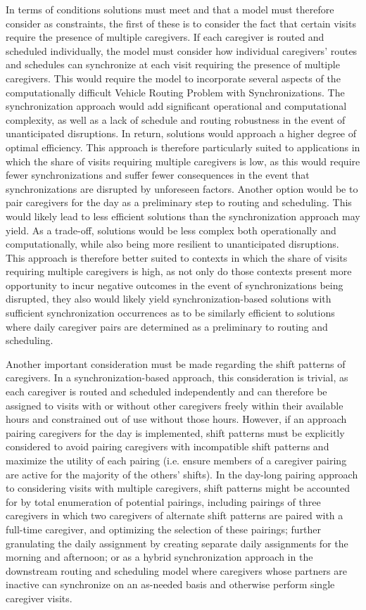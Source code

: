 \documentclass[11pt,twoside]{article}
\numberwithin{Theorem}{section}
\numberwithin{Definition}{section}
\numberwithin{Lemma}{section}
\numberwithin{Algorithm}{section}
\numberwithin{equation}{section}
\begin{document}
In terms of conditions solutions must meet and that a model must therefore consider as constraints, the first of these is to consider the fact that certain visits require the presence of multiple caregivers. If each caregiver is routed and scheduled individually, the model must consider how individual caregivers' routes and schedules can synchronize at each visit requiring the presence of multiple caregivers. This would require the model to incorporate several aspects of the computationally difficult Vehicle Routing Problem with Synchronizations. The synchronization approach would add significant operational and computational complexity, as well as a lack of schedule and routing robustness in the event of unanticipated disruptions. In return, solutions would approach a higher degree of optimal efficiency. This approach is therefore particularly suited to applications in which the share of visits requiring multiple caregivers is low, as this would require fewer synchronizations and suffer fewer consequences in the event that synchronizations are disrupted by unforeseen factors. Another option would be to pair caregivers for the day as a preliminary step to routing and scheduling. This would likely lead to less efficient solutions than the synchronization approach may yield. As a trade-off, solutions would be less complex both operationally and computationally, while also being more resilient to unanticipated disruptions. This approach is therefore better suited to contexts in which the share of visits requiring multiple caregivers is high, as not only do those contexts present more opportunity to incur negative outcomes in the event of synchronizations being disrupted, they also would likely yield synchronization-based solutions with sufficient synchronization occurrences as to be similarly efficient to solutions where daily caregiver pairs are determined as a preliminary to routing and scheduling. 

Another important consideration must be made regarding the shift patterns of caregivers. In a synchronization-based approach, this consideration is trivial, as each caregiver is routed and scheduled independently and can therefore be assigned to visits with or without other caregivers freely within their available hours and constrained out of use without those hours. However, if an approach pairing caregivers for the day is implemented, shift patterns must be explicitly considered to avoid pairing caregivers with incompatible shift patterns and maximize the utility of each pairing (i.e. ensure members of a caregiver pairing are active for the majority of the others' shifts). In the day-long pairing approach to considering visits with multiple caregivers, shift patterns might be accounted for by total enumeration of potential pairings, including pairings of three caregivers in which two caregivers of alternate shift patterns are paired with a full-time caregiver, and optimizing the selection of these pairings; further granulating the daily assignment by creating separate daily assignments for the morning and afternoon; or as a hybrid synchronization approach in the downstream routing and scheduling model where caregivers whose partners are inactive can synchronize on an as-needed basis and otherwise perform single caregiver visits.
\end{document}
